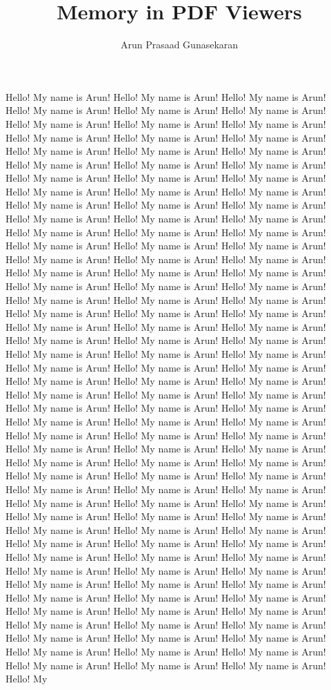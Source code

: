 \documentclass[10pt,a4paper,oneside]{article}
\author{Arun Prasaad Gunasekaran}
\title{Memory in PDF Viewers}
\begin{document}
	
	\maketitle
	Hello! My name is Arun! 	Hello! My name is Arun!	Hello! My name is Arun!	Hello! My name is Arun!	Hello! My name is Arun!	Hello! My name is Arun!	Hello! My name is Arun!	Hello! My name is Arun!	Hello! My name is Arun!	Hello! My name is Arun!	Hello! My name is Arun!	Hello! My name is Arun!	Hello! My name is Arun!	Hello! My name is Arun!	Hello! My name is Arun!	Hello! My name is Arun!	Hello! My name is Arun!	Hello! My name is Arun!	Hello! My name is Arun!	Hello! My name is Arun!	Hello! My name is Arun! 	Hello! My name is Arun!	Hello! My name is Arun!	Hello! My name is Arun!	Hello! My name is Arun!	Hello! My name is Arun!	Hello! My name is Arun!	Hello! My name is Arun!	Hello! My name is Arun!	Hello! My name is Arun!	Hello! My name is Arun!	Hello! My name is Arun!	Hello! My name is Arun!	Hello! My name is Arun!	Hello! My name is Arun!	Hello! My name is Arun!	Hello! My name is Arun!	Hello! My name is Arun!	Hello! My name is Arun!	Hello! My name is Arun!	Hello! My name is Arun! 	Hello! My name is Arun!	Hello! My name is Arun!	Hello! My name is Arun!	Hello! My name is Arun!	Hello! My name is Arun!	Hello! My name is Arun!	Hello! My name is Arun!	Hello! My name is Arun!	Hello! My name is Arun!	Hello! My name is Arun!	Hello! My name is Arun!	Hello! My name is Arun!	Hello! My name is Arun!	Hello! My name is Arun!	Hello! My name is Arun!	Hello! My name is Arun!	Hello! My name is Arun!	Hello! My name is Arun!	Hello! My name is Arun!	Hello! My name is Arun! 	Hello! My name is Arun!	Hello! My name is Arun!	Hello! My name is Arun!	Hello! My name is Arun!	Hello! My name is Arun!	Hello! My name is Arun!	Hello! My name is Arun!	Hello! My name is Arun!	Hello! My name is Arun!	Hello! My name is Arun!	Hello! My name is Arun!	Hello! My name is Arun!	Hello! My name is Arun!	Hello! My name is Arun!	Hello! My name is Arun!	Hello! My name is Arun!	Hello! My name is Arun!	Hello! My name is Arun!	Hello! My name is Arun!	Hello! My name is Arun! 	Hello! My name is Arun!	Hello! My name is Arun!	Hello! My name is Arun!	Hello! My name is Arun!	Hello! My name is Arun!	Hello! My name is Arun!	Hello! My name is Arun!	Hello! My name is Arun!	Hello! My name is Arun!	Hello! My name is Arun!	Hello! My name is Arun!	Hello! My name is Arun!	Hello! My name is Arun!	Hello! My name is Arun!	Hello! My name is Arun!	Hello! My name is Arun!	Hello! My name is Arun!	Hello! My name is Arun!	Hello! My name is Arun!	Hello! My name is Arun! 	Hello! My name is Arun!	Hello! My name is Arun!	Hello! My name is Arun!	Hello! My name is Arun!	Hello! My name is Arun!	Hello! My name is Arun!	Hello! My name is Arun!	Hello! My name is Arun!	Hello! My name is Arun!	Hello! My name is Arun!	Hello! My name is Arun!	Hello! My name is Arun!	Hello! My name is Arun!	Hello! My name is Arun!	Hello! My name is Arun!	Hello! My name is Arun!	Hello! My name is Arun!	Hello! My name is Arun!	Hello! My name is Arun!	Hello! My name is Arun! 	Hello! My name is Arun!	Hello! My name is Arun!	Hello! My name is Arun!	Hello! My name is Arun!	Hello! My name is Arun!	Hello! My name is Arun!	Hello! My name is Arun!	Hello! My name is Arun!	Hello! My 
\end{document}
